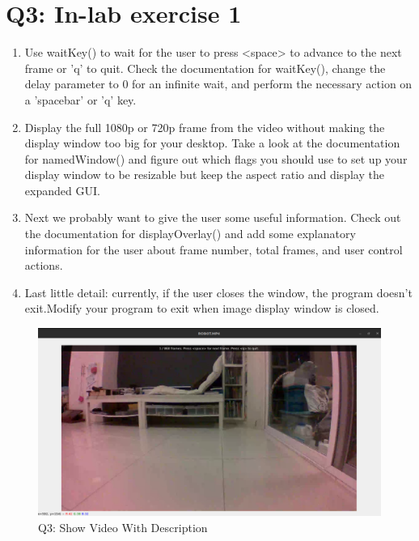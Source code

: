 \documentclass[a4paper,12pt]{article}
\begin{document}
\section{Q3: In-lab exercise 1}

\begin{enumerate}
	\item Use waitKey() to wait for the user to press <space> to advance to the next frame or 'q' to quit. Check the documentation for waitKey(), change the delay parameter to 0 for an infinite wait, and perform the necessary action on a 'spacebar' or 'q' key.
	\item Display the full 1080p or 720p frame from the video without making the display window too big for your desktop. Take a look at the documentation for namedWindow() and figure out which flags you should use to set up your display window to be resizable but keep the aspect ratio and display the expanded GUI.
	\item Next we probably want to give the user some useful information. Check out the documentation for displayOverlay() and add some explanatory information for the user about frame number, total frames, and user control actions.
	\item Last little detail: currently, if the user closes the window, the program doesn't exit.Modify your program to exit when image display window is closed.
\end{enumerate}

\begin{figure}
	\caption{Q3: Show Video With Description}
	\includegraphics*[scale=0.275]{img/Q3.png}
\end{figure}
\end{document}
